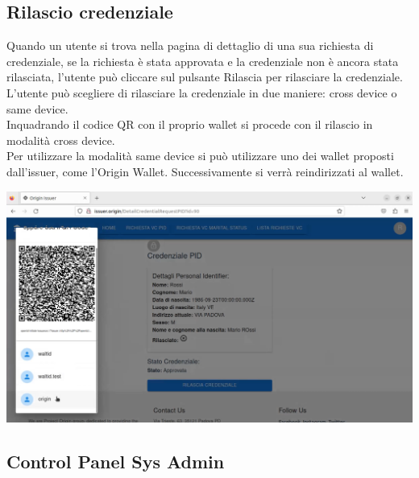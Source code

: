 \subsection{Rilascio credenziale}
Quando un utente si trova nella pagina di dettaglio di una sua richiesta di credenziale, se la richiesta è stata approvata e la credenziale non è ancora stata rilasciata, l'utente può cliccare sul pulsante Rilascia per rilasciare la credenziale. L'utente può scegliere di rilasciare la credenziale in due maniere: cross device o same device.\\
Inquadrando il codice QR con il proprio wallet si procede con il rilascio in modalità cross device.\\
Per utilizzare la modalità same device si può utilizzare uno dei wallet proposti dall'issuer, come l'Origin Wallet. Successivamente si verrà reindirizzati al wallet.
\begin{center}
\includegraphics[scale = 0.2]{./res/img/issuer/new/rilascio1.png}  
\end{center}


\subsection{Control Panel Sys Admin}
